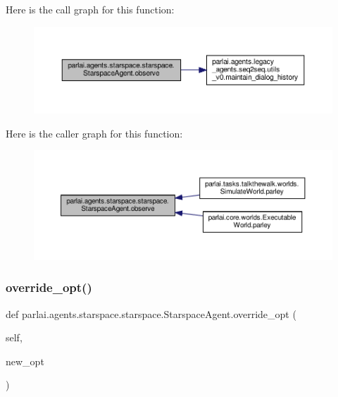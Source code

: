 Here is the call graph for this function\+:
\nopagebreak
\begin{figure}[H]
\begin{center}
\leavevmode
\includegraphics[width=350pt]{classparlai_1_1agents_1_1starspace_1_1starspace_1_1StarspaceAgent_a788b504ead65ec6af074717226cc07bb_cgraph}
\end{center}
\end{figure}
Here is the caller graph for this function\+:
\nopagebreak
\begin{figure}[H]
\begin{center}
\leavevmode
\includegraphics[width=350pt]{classparlai_1_1agents_1_1starspace_1_1starspace_1_1StarspaceAgent_a788b504ead65ec6af074717226cc07bb_icgraph}
\end{center}
\end{figure}
\mbox{\label{classparlai_1_1agents_1_1starspace_1_1starspace_1_1StarspaceAgent_ab75a17fe54cbc5ba074ca2df457235d4}} 
\subsubsection{\texorpdfstring{override\+\_\+opt()}{override\_opt()}}
{\footnotesize\ttfamily def parlai.\+agents.\+starspace.\+starspace.\+Starspace\+Agent.\+override\+\_\+opt (\begin{DoxyParamCaption}\item[{}]{self,  }\item[{}]{new\+\_\+opt }\end{DoxyParamCaption})}

